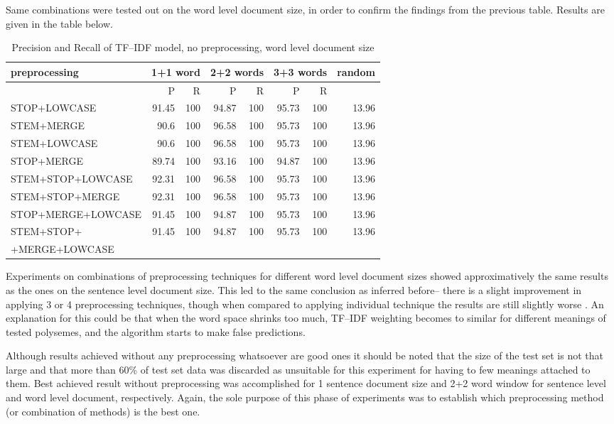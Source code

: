 Same combinations were tested out on the word level document size, in order to confirm the findings from the previous table. Results are given in the table below. 
\begin{table}[h!]
\begin{footnotesize}
\begin{tabular}{ l | r r | r r | r r | r}
preprocessing & \multicolumn{2}{l|}{1+1 word} & \multicolumn{2}{l|}{2+2 words} & \multicolumn{2}{l|}{3+3 words} & random\\
\hline\hline
	& P  &  R & P  &  R & P  &  R &\\
\hline
STOP+LOWCASE  & 91.45 & 100 & 94.87 & 100 & 95.73 & 100 & 13.96 \\
STEM+MERGE  & 90.6 & 100 & 96.58 & 100 & 95.73 & 100 & 13.96 \\
STEM+LOWCASE  & 90.6 & 100 & 96.58 & 100 & 95.73 & 100  & 13.96   \\
STOP+MERGE  & 89.74 & 100 & 93.16 & 100 & 94.87 & 100 & 13.96 \\
STEM+STOP+LOWCASE  & 92.31 & 100 & 96.58 & 100 & 95.73 & 100 & 13.96\\
STEM+STOP+MERGE  & 92.31 & 100 & 96.58 & 100 & 95.73 & 100 & 13.96 \\
STOP+MERGE+LOWCASE  & 91.45 & 100 & 94.87 & 100 & 95.73 & 100 & 13.96 \\
STEM+STOP+  & 91.45 & 100 & 94.87 & 100 & 95.73 & 100 & 13.96 \\
+MERGE+LOWCASE  &&&&&&&\\
\end{tabular}
\caption{Precision and Recall of TF--IDF model, no preprocessing, word level document size}
\end{footnotesize}
\end{table}

Experiments on combinations of preprocessing techniques for different word level document sizes showed approximatively the same results as the ones on the sentence level document size. This led to the same 
conclusion as inferred before-- there is a slight improvement in applying 3 or 4 preprocessing techniques, though when compared to applying individual technique the results are still slightly worse . An explanation for this could be that when the word space shrinks too much, TF--IDF weighting becomes to similar for different meanings of tested polysemes, and the algorithm starts to make false predictions.   


Although results achieved without any preprocessing whatsoever are good ones it should be noted that the size of the test set is not that large and that more than 60\% of test set data was 
discarded as unsuitable for this experiment for having to few meanings attached to them. Best achieved result without preprocessing was 
accomplished for 1 sentence document size and 2+2 word window for sentence level and word level document, respectively. Again, the sole purpose of this phase of experiments was to establish which preprocessing method (or combination of methods) is the best one.  

